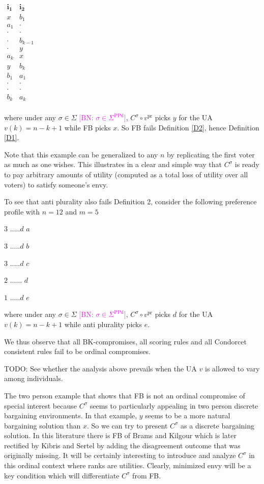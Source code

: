 \documentclass[version=3.21, pagesize, notitlepage, twoside=off, bibliography=totoc, DIV=calc, fontsize=12pt, a4paper]{scrartcl}
\newcommand{\commentBN}[1]{\textcolor{magenta}{\small$\big[$BN: #1$\big]$}}
\newcommand{\SPPd}{\Sigma^\text{PPd}}
\newcommand{\vpr}{v^\text{pr}}
\begin{document}
\begin{center}
	$
	\begin{array}{cc}
	\mathbf{i_1}& \mathbf{i_2} \\
	x &b_1\\
	a_1 &\cdot\\
	\cdot &\cdot\\
	\cdot &b_{k-1}\\
	\cdot &y\\
	a_k &x\\
	y &b_k\\
	b_1 &a_1\\
	\cdot &\cdot\\
	\cdot &\cdot\\
	b_k &a_k\\
	\end{array}
	$
\end{center}

where under any $\sigma \in \Sigma $ \commentBN{$\sigma \in \SPPd$}, $C^{\sigma }\circ \vpr$ picks $y$ for the UA $v(k)=n-k+1$ while FB picks $x$. So FB fails Definition \ref{D2}, hence Definition \ref{D1}.

Note that this example can be generalized to any $n$ by replicating the first voter as much as one wishes. This illustrates in a clear and simple
way that $C^{\sigma }$ is ready to pay arbitrary amounts of utility (computed as a total loss of utility over all voters) to satisfy someone's envy.

To see that anti plurality also fails Definition 2, consider the following preference profile with $n=12$ and $m=5$

$3$ $.....d$ $a$

$3$ $.....d$ $b$

$3$ $.....d$ $c$

$2$ $......$ $d$

$1$ $.....d$ $e$

\bigskip

where under any $\sigma \in \Sigma $ \commentBN{$\sigma \in \SPPd$}, $C^{\sigma }\circ \vpr$ picks $d$ for the UA $v(k)=n-k+1$ while anti plurality picks $e$.

We thus observe that all BK-compromises, all scoring rules and all Condorcet consistent rules fail to be ordinal compromises.

TODO: See whether the analysis above prevails when the UA $v$ is allowed to vary among individuals.

The two person example that shows that FB is not an ordinal compromise of special interest because $C^{\sigma }$ seems to particularly appealing in two person discrete bargaining environments. In that example, $y$ seems to be a more natural bargaining solution than $x$. So we can try to present $C^{\sigma }$ as a discrete bargaining solution. In this literature there is FB of Brams and Kilgour which is later rectified by Kibris and Sertel \cite{Sertel1999} by adding the disagreement outcome that was originally missing. It will be certainly interesting to introduce and analyze $C^{\sigma }$ in this ordinal context where ranks are utilities. Clearly, minimized envy will be a key condition which will differentiate $C^{\sigma }$ from FB.
\end{document}
